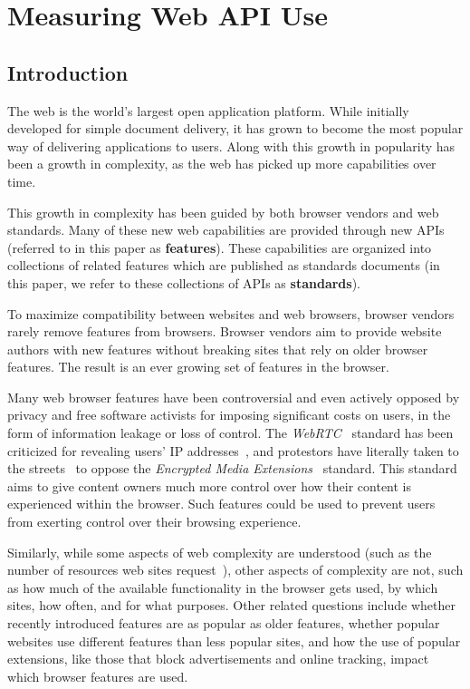 \chapter{Measuring Web API Use}
\section{Introduction}
The web is the world's largest open application platform.  While initially
developed for simple document delivery, it has grown to become the
most popular way of delivering applications to users.  Along with this growth
in popularity has been a growth in complexity, as the web has
picked up more capabilities over time.

This growth in complexity has been guided by both browser vendors and web
standards.  Many of these new web capabilities are provided through new
\JS APIs (referred to in this paper as \textbf{features}).  These
capabilities are organized into collections of related
features which are published as standards documents (in this paper, we
refer to these collections of APIs as \textbf{standards}).

To maximize compatibility between websites and web browsers,
browser vendors rarely remove features from browsers.  Browser vendors
aim to provide website authors with new features without breaking
sites that rely on older browser features.  The result is an ever growing
set of features in the browser.

Many web browser features have been controversial and even actively opposed
by privacy and free software activists for imposing significant costs
on users, in the form of information leakage or loss of control.
The \emph{WebRTC}~\cite{webrtcw3c} standard has been
criticized for revealing users' IP addresses~\cite{webrtcprivacy2015}, and
protestors have literally taken to the streets~\cite{emeprotests2016} to oppose the
\emph{Encrypted Media Extensions}~\cite{eme} standard. This standard aims to
give content owners much more control over how their content is experienced
within the browser. Such features could be used to prevent users from exerting
control over their browsing experience.

Similarly, while some aspects of web complexity are understood (such as the
number of resources web sites request~\cite{butkiewicz2011understanding}),
other aspects of complexity are not, such as how
much of the available functionality in the browser gets used, by which
sites, how often, and for what purposes.  Other related questions include
whether recently introduced features are as popular as older features, whether
popular websites use different features than less popular sites, and how the use
of popular extensions, like those that block advertisements and
online tracking, impact which browser features are used.

